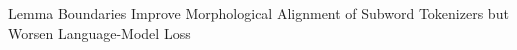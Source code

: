 Lemma Boundaries Improve Morphological Alignment of Subword Tokenizers but Worsen Language-Model Loss